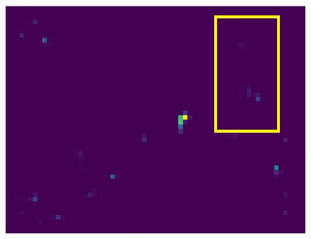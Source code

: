 \begin{figure}[h!]
{\begin{minipage}[t]{3.5cm}
		\end{minipage}
		\begin{minipage}[t]{3.5cm}
			\centering
			\includegraphics[width=0.9\linewidth]{figures/pixel/map4_3}
		\end{minipage}
		\label{fig:singlepixelmap_c}}
	

\end{figure}

